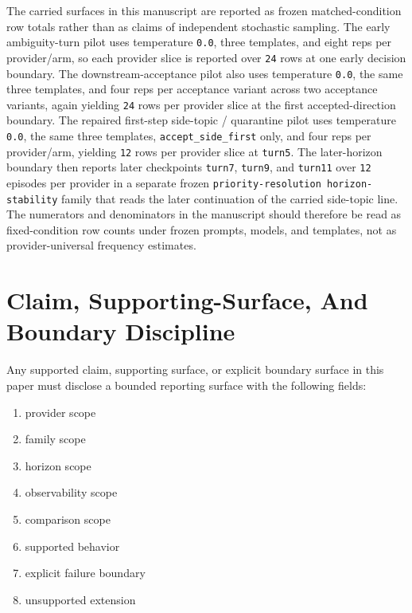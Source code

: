 \documentclass[11pt]{article}
\begin{document}
The carried surfaces in this manuscript are reported as frozen matched-condition
row totals rather than as claims of independent stochastic sampling. The early
ambiguity-turn pilot uses temperature \texttt{0.0}, three templates, and eight
reps per provider/arm, so each provider slice is reported over \texttt{24}
rows at one early decision boundary. The downstream-acceptance pilot also uses
temperature \texttt{0.0}, the same three templates, and four reps per
acceptance variant across two acceptance variants, again yielding \texttt{24}
rows per provider slice at the first accepted-direction boundary. The repaired
first-step side-topic / quarantine pilot uses temperature \texttt{0.0}, the
same three templates, \texttt{accept\_side\_first} only, and four reps per
provider/arm, yielding \texttt{12} rows per provider slice at \texttt{turn5}.
The later-horizon boundary then reports later checkpoints \texttt{turn7},
\texttt{turn9}, and \texttt{turn11} over \texttt{12} episodes per provider in
a separate frozen \texttt{priority-resolution horizon-stability} family that
reads the later continuation of the carried side-topic line. The numerators
and denominators in the manuscript should therefore be read as fixed-condition
row counts under frozen prompts, models, and templates, not as
provider-universal frequency estimates.

\section{Claim, Supporting-Surface, And Boundary Discipline}

Any supported claim, supporting surface, or explicit boundary surface in this
paper must disclose a bounded reporting surface with the following fields:

\begin{enumerate}
\item provider scope
\item family scope
\item horizon scope
\item observability scope
\item comparison scope
\item supported behavior
\item explicit failure boundary
\item unsupported extension
\end{enumerate}
\end{document}
